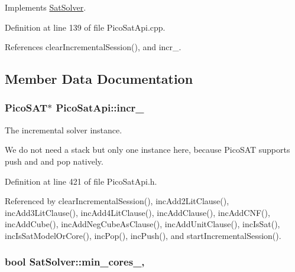Implements \hyperlink{classSatSolver_a74603f84c3f2383a5fc44d5a8093cbea}{Sat\-Solver}.



Definition at line 139 of file Pico\-Sat\-Api.\-cpp.



References clear\-Incremental\-Session(), and incr\-\_\-.



\subsection{Member Data Documentation}
\hypertarget{classPicoSatApi_ae056afcfe07c468fd5b1488dc6f6e48d}{
\subsubsection[{incr\-\_\-}]{\setlength{\rightskip}{0pt plus 5cm}Pico\-S\-A\-T$\ast$ Pico\-Sat\-Api\-::incr\-\_\-\hspace{0.3cm}{\ttfamily [protected]}}}\label{classPicoSatApi_ae056afcfe07c468fd5b1488dc6f6e48d}


The incremental solver instance. 

We do not need a stack but only one instance here, because Pico\-S\-A\-T supports push and and pop natively. 

Definition at line 421 of file Pico\-Sat\-Api.\-h.



Referenced by clear\-Incremental\-Session(), inc\-Add2\-Lit\-Clause(), inc\-Add3\-Lit\-Clause(), inc\-Add4\-Lit\-Clause(), inc\-Add\-Clause(), inc\-Add\-C\-N\-F(), inc\-Add\-Cube(), inc\-Add\-Neg\-Cube\-As\-Clause(), inc\-Add\-Unit\-Clause(), inc\-Is\-Sat(), inc\-Is\-Sat\-Model\-Or\-Core(), inc\-Pop(), inc\-Push(), and start\-Incremental\-Session().

\hypertarget{classSatSolver_adfeecebfd09606c82b5c57cfe5aad813}{
\subsubsection[{min\-\_\-cores\-\_\-}]{\setlength{\rightskip}{0pt plus 5cm}bool Sat\-Solver\-::min\-\_\-cores\-\_\-\hspace{0.3cm}{\ttfamily [protected]}, {\ttfamily [inherited]}}}\label{classSatSolver_adfeecebfd09606c82b5c57cfe5aad813}


